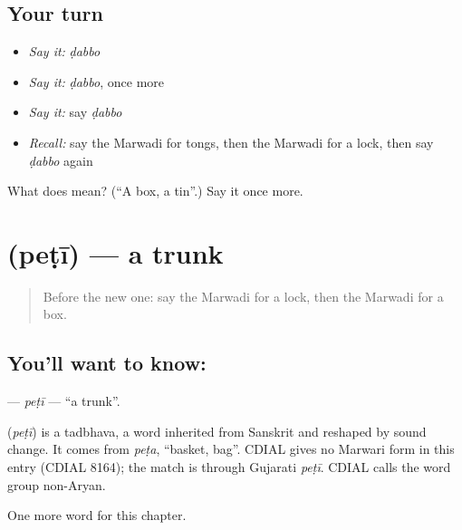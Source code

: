 \subsection*{Your turn}
\begin{itemize}
\raggedright
  \item \emph{Say it:} \emph{ḍabbo}
  \item \emph{Say it:} \emph{ḍabbo}, once more
  \item \emph{Say it:} say \emph{ḍabbo}
  \item \emph{Recall:} say the Marwadi for tongs, then the Marwadi for a lock, then say \emph{ḍabbo} again
\end{itemize}

\begin{tcolorbox}[breakable,colback=teal!4,colframe=teal!35!black,title={Before you move on}]
What does  mean? (\textquotedblleft{}A box, a tin\textquotedblright{}.) Say it once more.
\end{tcolorbox}
\section[\texorpdfstring{\mw{पेटी} (peṭī)}{पेटी (peṭī)}]{ (peṭī) — a trunk}

\label{lesson:MW-C122-peti}



\begin{quote}
Before the new one: say the Marwadi for a lock, then the Marwadi for a box.
\end{quote}

\subsection*{You'll want to know: }
\textbf{} — \emph{peṭī} — \textquotedblleft{}a trunk\textquotedblright{}.

\begin{cousinweb}
\textbf{} (\emph{peṭī}) is a tadbhava, a word inherited from Sanskrit and reshaped by sound change. It comes from \emph{peṭa}, \textquotedblleft{}basket, bag\textquotedblright{}. CDIAL gives no Marwari form in this entry (CDIAL 8164); the match is through Gujarati \emph{peṭī}. CDIAL calls the word group non-Aryan.
\end{cousinweb}

\begin{grammarlens}[title={What you've built}]
One more word for this chapter.
\end{grammarlens}

